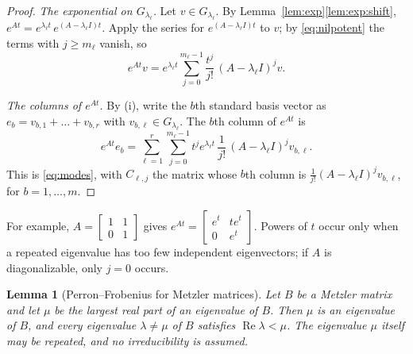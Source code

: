\documentclass[11pt]{article}
\newtheorem{lemma}[theorem]{Lemma}
\theoremstyle{definition}
\theoremstyle{remark}
\renewcommand{\Re}{\operatorname{Re}}
\begin{document}
\begin{proof}
\emph{The exponential on $G_{\lambda_\ell}$.} Let $v \in G_{\lambda_\ell}$. By
Lemma~\ref{lem:exp}\ref{lem:exp:shift}, $e^{At} = e^{\lambda_\ell t}\, e^{(A - \lambda_\ell I)t}$.
Apply the series for $e^{(A - \lambda_\ell I)t}$ to $v$; by \eqref{eq:nilpotent} the terms with
$j \ge m_\ell$ vanish, so
\[
  e^{At} v = e^{\lambda_\ell t} \sum_{j=0}^{m_\ell - 1} \frac{t^{j}}{j!}\, (A - \lambda_\ell I)^{j} v .
\]

\emph{The columns of $e^{At}$.} By (i), write the $b$th standard basis vector as
$e_b = v_{b,1} + \dots + v_{b,r}$ with $v_{b,\ell} \in G_{\lambda_\ell}$. The $b$th column of
$e^{At}$ is
\[
  e^{At} e_b = \sum_{\ell=1}^{r} \sum_{j=0}^{m_\ell - 1} t^{j} e^{\lambda_\ell t}\,
  \frac{1}{j!}\, (A - \lambda_\ell I)^{j} v_{b,\ell} .
\]
This is \eqref{eq:modes}, with $C_{\ell,j}$ the matrix whose $b$th column is
$\frac{1}{j!} (A - \lambda_\ell I)^{j} v_{b,\ell}$, for $b = 1, \dots, m$.
\end{proof}

For example, $A = \begin{bmatrix} 1 & 1 \\ 0 & 1 \end{bmatrix}$ gives
$e^{At} = \begin{bmatrix} e^{t} & t e^{t} \\ 0 & e^{t} \end{bmatrix}$. Powers of $t$ occur only
when a repeated eigenvalue has too few independent eigenvectors; if $A$ is diagonalizable, only
$j = 0$ occurs.

\begin{lemma}[Perron--Frobenius for Metzler matrices]\label{lem:PF}
Let $B$ be a Metzler matrix and let $\mu$ be the largest real part of an eigenvalue of $B$. Then
$\mu$ is an eigenvalue of $B$, and every eigenvalue $\lambda \ne \mu$ of $B$ satisfies
$\Re\lambda < \mu$. The eigenvalue $\mu$ itself may be repeated, and no irreducibility is assumed.
\end{lemma}
\end{document}
